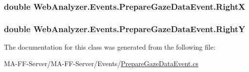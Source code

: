 \subsubsection[{Right\+X}]{\setlength{\rightskip}{0pt plus 5cm}double Web\+Analyzer.\+Events.\+Prepare\+Gaze\+Data\+Event.\+Right\+X\hspace{0.3cm}{\ttfamily [get]}}\label{class_web_analyzer_1_1_events_1_1_prepare_gaze_data_event_a680a99afeb211df3bbeb59ba505478c1}
\hypertarget{class_web_analyzer_1_1_events_1_1_prepare_gaze_data_event_a6e215a1ac2257a554a0af8c4adb11096}{}
\subsubsection[{Right\+Y}]{\setlength{\rightskip}{0pt plus 5cm}double Web\+Analyzer.\+Events.\+Prepare\+Gaze\+Data\+Event.\+Right\+Y\hspace{0.3cm}{\ttfamily [get]}}\label{class_web_analyzer_1_1_events_1_1_prepare_gaze_data_event_a6e215a1ac2257a554a0af8c4adb11096}


The documentation for this class was generated from the following file\+:\begin{DoxyCompactItemize}
\item 
M\+A-\/\+F\+F-\/\+Server/\+M\+A-\/\+F\+F-\/\+Server/\+Events/\hyperlink{_prepare_gaze_data_event_8cs}{Prepare\+Gaze\+Data\+Event.\+cs}\end{DoxyCompactItemize}
